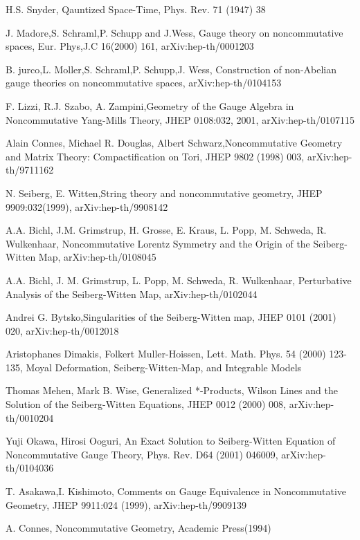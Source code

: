 \documentclass[a4paper,a4paper]{article}%
\begin{document}
\begin{thebibliography}{9}                                                                                                %

H.S. Snyder, Qauntized Space-Time, Phys. Rev. 71 (1947) 38

J. Madore,S. Schraml,P. Schupp and J.Wess, Gauge theory on
noncommutative spaces, Eur. Phys,J.C 16(2000) 161, arXiv:hep-th/0001203

B. jurco,L. Moller,S. Schraml,P. Schupp,J. Wess, Construction of
non-Abelian gauge theories on noncommutative spaces, arXiv:hep-th/0104153

F. Lizzi, R.J. Szabo, A. Zampini,Geometry of the Gauge Algebra in
Noncommutative Yang-Mills Theory, JHEP 0108:032, 2001, arXiv:hep-th/0107115

Alain Connes, Michael R. Douglas, Albert Schwarz,Noncommutative
Geometry and Matrix Theory: Compactification on Tori, JHEP 9802 (1998) 003, arXiv:hep-th/9711162

N. Seiberg, E. Witten,String theory and noncommutative geometry,
JHEP 9909:032(1999), arXiv:hep-th/9908142

A.A. Bichl, J.M. Grimstrup, H. Grosse, E. Kraus, L. Popp, M.
Schweda, R. Wulkenhaar, Noncommutative Lorentz Symmetry and the Origin of the
Seiberg-Witten Map, arXiv:hep-th/0108045

A.A. Bichl, J. M. Grimstrup, L. Popp, M. Schweda, R. Wulkenhaar,
Perturbative Analysis of the Seiberg-Witten Map, arXiv:hep-th/0102044

Andrei G. Bytsko,Singularities of the Seiberg-Witten map, JHEP
0101 (2001) 020, arXiv:hep-th/0012018

Aristophanes Dimakis, Folkert Muller-Hoissen, Lett. Math. Phys.
54 (2000) 123-135, Moyal Deformation, Seiberg-Witten-Map, and Integrable Models

Thomas Mehen, Mark B. Wise, Generalized *-Products, Wilson Lines
and the Solution of the Seiberg-Witten Equations, JHEP 0012 (2000) 008, arXiv:hep-th/0010204

Yuji Okawa, Hirosi Ooguri, An Exact Solution to Seiberg-Witten
Equation of Noncommutative Gauge Theory, Phys. Rev. D64 (2001) 046009, arXiv:hep-th/0104036

T. Asakawa,I. Kishimoto, Comments on Gauge Equivalence in
Noncommutative Geometry, JHEP 9911:024 (1999), arXiv:hep-th/9909139

A. Connes, Noncommutative Geometry, Academic Press(1994)
\end{thebibliography}
\end{document}
